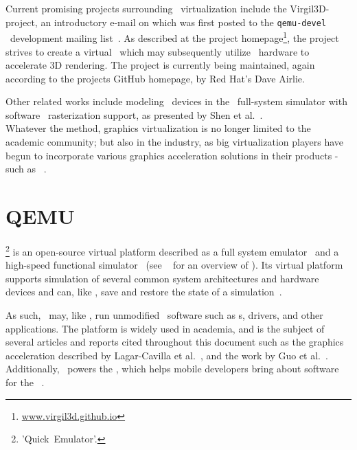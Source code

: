 Current promising projects surrounding \dvttermgpu\ virtualization include the Virgil3D-project, an introductory e-mail on which was first posted to the \texttt{qemu-devel} \dvttermqemu\ development mailing list~.
As described at the project homepage\footnote{\href{http://virgil3d.github.io/}{www.virgil3d.github.io}}, the project strives to create a virtual \dvttermgpu\ which may subsequently utilize \dvttermhost\ hardware to accelerate 3D rendering.
The project is currently being maintained, again according to the projects GitHub homepage, by Red Hat's Dave Airlie.

Other related works include modeling \dvttermgpu\ devices in the \dvttermqemu\ full-system simulator with software \dvttermopengles\ rasterization support, as presented by Shen et al.~.\\

\noindent
Whatever the method, graphics virtualization is no longer limited to the academic community; but also in the industry, as big virtualization players have begun to incorporate various graphics acceleration solutions in their products - such as \dvttermvmware ~.

\section{QEMU}
\label{sec:relatedwork_qemu}
\dvttermqemu \footnote{'Quick~Emulator'.} is an open-source virtual platform described as a full system emulator~ and a high-speed functional simulator~ (see ~ for an overview of \dvttermqemu ).
Its virtual platform supports simulation of several common system architectures and hardware devices and can, like \dvttermsimics , save and restore the state of a simulation~.

As such, \dvttermqemu\ may, like \dvttermsimics , run unmodified \dvttermtarget\ software such as \dvttermos s, drivers, and other applications.
The platform is widely used in academia, and is the subject of several articles and reports cited throughout this document such as the graphics acceleration described by Lagar-Cavilla et al.~, and the work by Guo et al.~.
Additionally, \dvttermqemu\ powers the \dvttermandroidemulator , which helps mobile developers bring about software for the \dvttermandroid\ \dvttermos .

